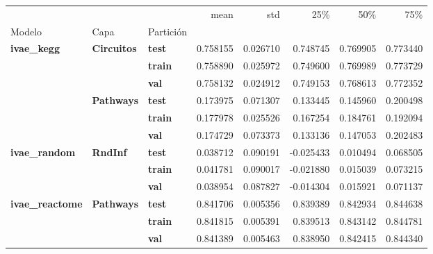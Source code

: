 \begin{tabular}{lllrrrrr}
\toprule
 &  &  & mean & std & 25\% & 50\% & 75\% \\
Modelo & Capa & Partición &  &  &  &  &  \\
\midrule
\multirow[t]{6}{*}{\textbf{ivae\_kegg}} & \multirow[t]{3}{*}{\textbf{Circuitos}} & \textbf{test} & 0.758155 & 0.026710 & 0.748745 & 0.769905 & 0.773440 \\
\textbf{} & \textbf{} & \textbf{train} & 0.758890 & 0.025972 & 0.749600 & 0.769989 & 0.773729 \\
\textbf{} & \textbf{} & \textbf{val} & 0.758132 & 0.024912 & 0.749153 & 0.768613 & 0.772352 \\
\cline{2-8}
\textbf{} & \multirow[t]{3}{*}{\textbf{Pathways}} & \textbf{test} & 0.173975 & 0.071307 & 0.133445 & 0.145960 & 0.200498 \\
\textbf{} & \textbf{} & \textbf{train} & 0.177978 & 0.025526 & 0.167254 & 0.184761 & 0.192094 \\
\textbf{} & \textbf{} & \textbf{val} & 0.174729 & 0.073373 & 0.133136 & 0.147053 & 0.202483 \\
\cline{1-8} \cline{2-8}
\multirow[t]{3}{*}{\textbf{ivae\_random}} & \multirow[t]{3}{*}{\textbf{RndInf}} & \textbf{test} & 0.038712 & 0.090191 & -0.025433 & 0.010494 & 0.068505 \\
\textbf{} & \textbf{} & \textbf{train} & 0.041781 & 0.090017 & -0.021880 & 0.015039 & 0.073215 \\
\textbf{} & \textbf{} & \textbf{val} & 0.038954 & 0.087827 & -0.014304 & 0.015921 & 0.071137 \\
\cline{1-8} \cline{2-8}
\multirow[t]{3}{*}{\textbf{ivae\_reactome}} & \multirow[t]{3}{*}{\textbf{Pathways}} & \textbf{test} & 0.841706 & 0.005356 & 0.839389 & 0.842934 & 0.844638 \\
\textbf{} & \textbf{} & \textbf{train} & 0.841815 & 0.005391 & 0.839513 & 0.843142 & 0.844781 \\
\textbf{} & \textbf{} & \textbf{val} & 0.841389 & 0.005463 & 0.838950 & 0.842415 & 0.844340 \\
\cline{1-8} \cline{2-8}
\bottomrule
\end{tabular}
